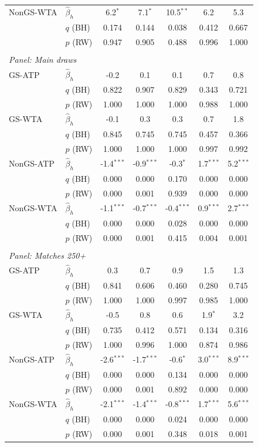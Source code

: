 \begin{tabular}{ll*{5}{c}}
NonGS-WTA & $\hat{\beta}_h$ & 6.2$^{*}$ & 7.1$^{*}$ & 10.5$^{**}$ & 6.2 & 5.3 \\
 & $q$ (BH) & 0.174 & 0.144 & 0.038 & 0.412 & 0.667 \\
 & $p$ (RW) & 0.947 & 0.905 & 0.488 & 0.996 & 1.000 \\[0.2em]
\\[0.3em]
\multicolumn{7}{l}{\textit{Panel: Main draws}} \\ \midrule
GS-ATP & $\hat{\beta}_h$ & -0.2 & 0.1 & 0.1 & 0.7 & 0.8 \\
 & $q$ (BH) & 0.822 & 0.907 & 0.829 & 0.343 & 0.721 \\
 & $p$ (RW) & 1.000 & 1.000 & 1.000 & 0.988 & 1.000 \\[0.2em]
GS-WTA & $\hat{\beta}_h$ & -0.1 & 0.3 & 0.3 & 0.7 & 1.8 \\
 & $q$ (BH) & 0.845 & 0.745 & 0.745 & 0.457 & 0.366 \\
 & $p$ (RW) & 1.000 & 1.000 & 1.000 & 0.997 & 0.992 \\[0.2em]
NonGS-ATP & $\hat{\beta}_h$ & -1.4$^{***}$ & -0.9$^{***}$ & -0.3$^{*}$ & 1.7$^{***}$ & 5.2$^{***}$ \\
 & $q$ (BH) & 0.000 & 0.000 & 0.170 & 0.000 & 0.000 \\
 & $p$ (RW) & 0.000 & 0.001 & 0.939 & 0.000 & 0.000 \\[0.2em]
NonGS-WTA & $\hat{\beta}_h$ & -1.1$^{***}$ & -0.7$^{***}$ & -0.4$^{***}$ & 0.9$^{***}$ & 2.7$^{***}$ \\
 & $q$ (BH) & 0.000 & 0.000 & 0.028 & 0.000 & 0.000 \\
 & $p$ (RW) & 0.000 & 0.001 & 0.415 & 0.004 & 0.001 \\[0.2em]
\\[0.3em]
\multicolumn{7}{l}{\textit{Panel: Matches 250+}} \\ \midrule
GS-ATP & $\hat{\beta}_h$ & 0.3 & 0.7 & 0.9 & 1.5 & 1.3 \\
 & $q$ (BH) & 0.841 & 0.606 & 0.460 & 0.280 & 0.745 \\
 & $p$ (RW) & 1.000 & 1.000 & 0.997 & 0.985 & 1.000 \\[0.2em]
GS-WTA & $\hat{\beta}_h$ & -0.5 & 0.8 & 0.6 & 1.9$^{*}$ & 3.2 \\
 & $q$ (BH) & 0.735 & 0.412 & 0.571 & 0.134 & 0.316 \\
 & $p$ (RW) & 1.000 & 0.996 & 1.000 & 0.874 & 0.986 \\[0.2em]
NonGS-ATP & $\hat{\beta}_h$ & -2.6$^{***}$ & -1.7$^{***}$ & -0.6$^{*}$ & 3.0$^{***}$ & 8.9$^{***}$ \\
 & $q$ (BH) & 0.000 & 0.000 & 0.134 & 0.000 & 0.000 \\
 & $p$ (RW) & 0.000 & 0.001 & 0.892 & 0.000 & 0.000 \\[0.2em]
NonGS-WTA & $\hat{\beta}_h$ & -2.1$^{***}$ & -1.4$^{***}$ & -0.8$^{***}$ & 1.7$^{***}$ & 5.6$^{***}$ \\
 & $q$ (BH) & 0.000 & 0.000 & 0.024 & 0.000 & 0.000 \\
 & $p$ (RW) & 0.000 & 0.001 & 0.348 & 0.018 & 0.001 \\[0.2em]
\bottomrule
\end{tabular}
